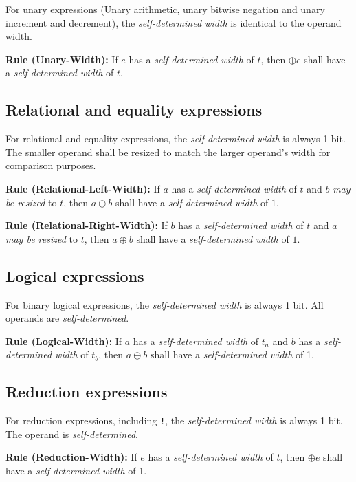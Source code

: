 \documentclass{article}
\newcommand{\sds}{\emph{self-determined width}}
\newcommand{\mbr}{\emph{may be resized}}
\newenvironment{typingrule}[1]%
{\par\noindent\textbf{Rule (#1):} }%
{\par}
\begin{document}
For unary expressions (Unary arithmetic, unary bitwise negation and unary
increment and decrement), the \sds{} is identical to the
operand width.

\begin{typingrule}{Unary-Width}
  If $e$ has a \sds{} of $t$, then $\oplus e$ shall have
  a \sds{} of $t$.
\end{typingrule}

\subsection{Relational and equality expressions}%

For relational and equality expressions, the \sds{} is
always 1 bit. The smaller operand shall be resized to match the larger operand's
width for comparison purposes.

\begin{typingrule}{Relational-Left-Width}
  If $a$ has a \sds{} of $t$ and $b$ \mbr{}
  to $t$, then $a \oplus b$ shall have a \sds{} of $1$.
\end{typingrule}

\begin{typingrule}{Relational-Right-Width}
  If $b$ has a \sds{} of $t$ and $a$ \mbr{}
  to $t$, then $a \oplus b$ shall have a \sds{} of $1$.
\end{typingrule}

\subsection{Logical expressions}%

For binary logical expressions, the \sds{} is always 1 bit.
All operands are \emph{self-determined}.

\begin{typingrule}{Logical-Width}
  If $a$ has a \sds{} of $t_{a}$ and $b$ has a
  \sds{} of $t_{b}$, then $a \oplus b$ shall have a
  \sds{} of 1.
\end{typingrule}

\subsection{Reduction expressions}%

For reduction expressions, including \texttt{!}, the \sds{}
is always 1 bit. The operand is \emph{self-determined}.

\begin{typingrule}{Reduction-Width}
  If $e$ has a \sds{} of $t$, then $\oplus e$ shall have a
  \sds{} of 1.
\end{typingrule}
\end{document}
